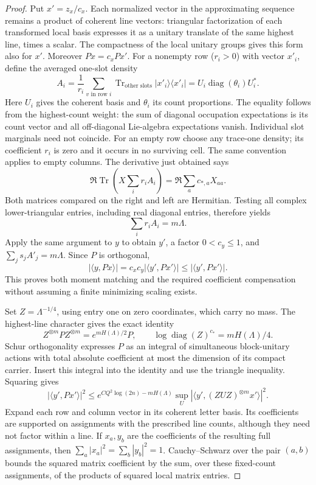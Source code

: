\begin{proof}
Put $x'=z_x/c_x$. Each normalized vector in the approximating sequence remains a product of coherent line vectors: triangular factorization of each transformed local basis expresses it as a unitary translate of the same highest line, times a scalar. The compactness of the local unitary groups gives this form also for $x'$. Moreover $Px=c_xPx'$. For a nonempty row ($r_i>0$) with vector $x'_i$, define the averaged one-slot density
\[
 A_i=\frac1{r_i}\sum_{v\text{ in row }i}
       \operatorname{Tr}_{\text{other slots}}|x'_i\rangle\langle x'_i|
     =U_i\operatorname{diag}(\theta_i)U_i^*.
\]
Here $U_i$ gives the coherent basis and $\theta_i$ its count proportions. The equality follows from the highest-count weight: the sum of diagonal occupation expectations is its count vector and all off-diagonal Lie-algebra expectations vanish. Individual slot marginals need not coincide. For an empty row choose any trace-one density; its coefficient $r_i$ is zero and it occurs in no surviving cell. The same convention applies to empty columns. The derivative just obtained says
\[
 \Re\operatorname{Tr}\!\left(X\sum_i r_iA_i\right)
 =\Re\sum_a c_{*,a}X_{aa}.
\]
Both matrices compared on the right and left are Hermitian. Testing all complex lower-triangular entries, including real diagonal entries, therefore yields
\begin{equation}\label{rec:coherent-moment-match}
 \sum_i r_iA_i=m\Lambda.
\end{equation}
Apply the same argument to $y$ to obtain $y'$, a factor $0<c_y\le1$, and $\sum_j s_jA'_j=m\Lambda$. Since $P$ is orthogonal,
\[
 |\langle y,Px\rangle|=c_xc_y|\langle y',Px'\rangle|
 \le|\langle y',Px'\rangle|.
\]
This proves both moment matching and the required coefficient compensation without assuming a finite minimizing scaling exists.

Set $Z=\Lambda^{-1/4}$, using entry one on zero coordinates, which
carry no mass.  The highest-line character gives the exact identity
\[
 Z^{\otimes m}PZ^{\otimes m}=e^{mH(\Lambda)/2}P,
 \qquad
 \log\operatorname{diag}(Z)^{c_*}=mH(\Lambda)/4.
\]
Schur orthogonality expresses $P$ as an integral of simultaneous
block-unitary actions with total absolute coefficient at most the
dimension of its compact carrier.  Insert this integral into the
identity and use the triangle inequality.  Squaring gives
\begin{equation}\label{rec:coherent-scaled-projector}
 |\langle y',Px'\rangle|^2
 \le e^{CQ^2\log(2n)-mH(\Lambda)}
       \sup_U|\langle y',(ZUZ)^{\otimes m}x'\rangle|^2.
\end{equation}
Expand each row and column vector in its coherent letter basis. Its coefficients are supported on assignments with the prescribed line counts, although they need not factor within a line. If $x_a,y_b$ are the coefficients of the resulting full assignments, then $\sum_a|x_a|^2=\sum_b|y_b|^2=1$. Cauchy--Schwarz over the pair $(a,b)$ bounds the squared matrix coefficient by the sum, over these fixed-count assignments, of the products of squared local matrix entries.


\end{proof}
